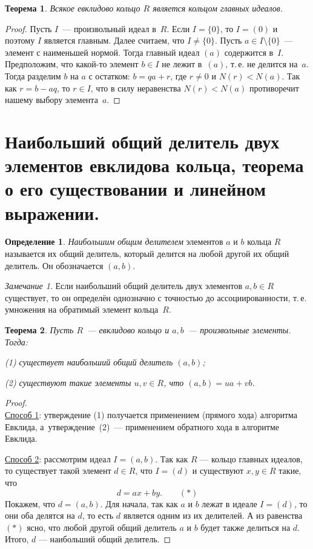 \documentclass[a4paper, 12pt]{article}
\newtheorem{theorem}{Теорема}
\theoremstyle{definition}
\newtheorem{definition}{Определение}
\theoremstyle{remark}
\newtheorem{remark}{Замечание}
\begin{document}
\begin{theorem} \label{thm_er_rpi}
Всякое евклидово кольцо $R$ является кольцом главных идеалов.
\end{theorem}

\begin{proof}
Пусть $I$~--- произвольный идеал в~$R$. Если $I = \lbrace 0
\rbrace$, то $I = (0)$ и поэтому $I$ является главным. Далее
считаем, что $I \ne \lbrace 0 \rbrace$. Пусть $a \in I \setminus
\lbrace 0 \rbrace$~--- элемент с наименьшей нормой. Тогда главный
идеал $(a)$ содержится в~$I$. Предположим, что какой-то элемент $b
\in I$ не лежит в~$(a)$, т.\,е. не делится на~$a$. Тогда разделим
$b$ на $a$ с остатком: $b = qa + r$, где $r \ne 0$ и $N(r) < N(a)$.
Так как $r = b - aq$, то $r \in I$, что в силу неравенства $N(r) <
N(a)$ противоречит нашему выбору элемента~$a$.
\end{proof}

\section{Наибольший общий делитель двух элементов евклидова кольца, теорема о его существовании и линейном выражении.}

\begin{definition}
{\it Наибольшим общим делителем} элементов $a$ и $b$ кольца $R$
называется их общий делитель, который делится на любой другой их
общий делитель. Он обозначается $(a,b)$.
\end{definition}

\begin{remark}
Если наибольший общий делитель двух элементов $a,b \in R$
существует, то он определён однозначно с точностью до
ассоциированности, т.\,е. умножения на обратимый элемент кольца~$R$.
\end{remark}

\begin{theorem} \label{thm_lcd}
Пусть $R$~--- евклидово кольцо и $a,b$~--- произвольные элементы.
Тогда:

\textup{(1)} существует наибольший общий делитель $(a,b)$;

\textup{(2)} существуют такие элементы $u,v \in R$, что $(a,b) = ua
+ vb$.
\end{theorem}

\begin{proof}\ \\
\underline{Способ 1}:  утверждение (1) получается применением
(прямого хода) алгоритма Евклида, а~утверждение~(2)~--- применением
обратного хода в алгоритме Евклида.

\underline{Способ 2}: рассмотрим идеал $I = (a, b)$. Так как $R$ --- кольцо главных идеалов, то существует такой элемент $d \in R$, что $I = (d)$ и существуют $x, y \in R$ такие, что 
$$
d = ax + by. \qquad (*)
$$
Покажем, что $d = (a, b)$. Для начала, так как $a$ и $b$ лежат в идеале $I = (d)$, то они оба делятся на $d$, то есть $d$ является одним из их делителей. А из равенства $(*)$ ясно, что любой другой общий делитель $a$ и $b$ будет также делиться на $d$. Итого, $d$ --- наибольший общий делитель.
\end{proof}
\end{document}
